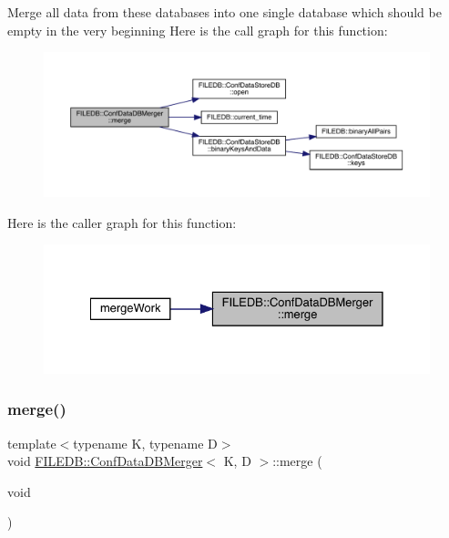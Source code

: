 Merge all data from these databases into one single database which should be empty in the very beginning Here is the call graph for this function\+:
\nopagebreak
\begin{figure}[H]
\begin{center}
\leavevmode
\includegraphics[width=350pt]{db/d60/classFILEDB_1_1ConfDataDBMerger_a6738f9880645518ba94eccd3b2037f24_cgraph}
\end{center}
\end{figure}
Here is the caller graph for this function\+:\nopagebreak
\begin{figure}[H]
\begin{center}
\leavevmode
\includegraphics[width=328pt]{db/d60/classFILEDB_1_1ConfDataDBMerger_a6738f9880645518ba94eccd3b2037f24_icgraph}
\end{center}
\end{figure}
\mbox{\label{classFILEDB_1_1ConfDataDBMerger_a6738f9880645518ba94eccd3b2037f24}} 
\subsubsection{\texorpdfstring{merge()}{merge()}\hspace{0.1cm}{\footnotesize\ttfamily [2/2]}}
{\footnotesize\ttfamily template$<$typename K, typename D$>$ \\
void \mbox{\hyperlink{classFILEDB_1_1ConfDataDBMerger}{F\+I\+L\+E\+D\+B\+::\+Conf\+Data\+D\+B\+Merger}}$<$ K, D $>$\+::merge (\begin{DoxyParamCaption}\item[{void}]{ }\end{DoxyParamCaption})\hspace{0.3cm}{\ttfamily [inline]}}

